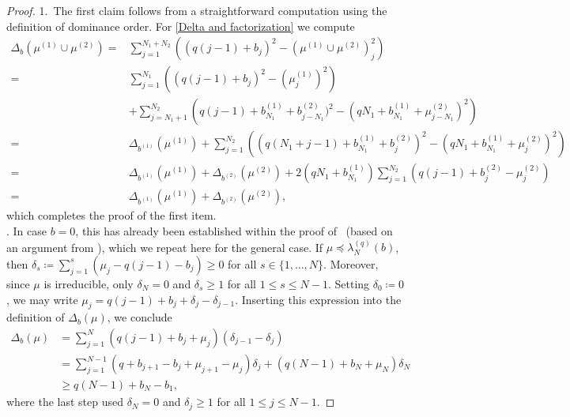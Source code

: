 \documentclass[letterpaper, DIV=17]{scrartcl}
\numberwithin{equation}{section}
\theoremstyle{definition}
\begin{document}
		\begin{proof}
			1.~The first claim follows from a straightforward computation using the definition of dominance order.		
			For \eqref{Delta and factorization} we compute
			\begin{align*}
				\Delta_b(\mu^{(1)}\cup \mu^{(2)})
				=  & \sum_{j=1}^{N_1+N_2} \left((q (j-1) + b_j )^2 - (\mu^{(1)}\cup \mu^{(2)})_j^2\right) \\
				=  &\sum_{j=1}^{N_1} \left((q (j-1) + b_j )^2 - (\mu^{(1)}_j)^2\right) \\
				& + \sum_{j=N_1+1}^{N_2} \left(q (j-1) + b_{N_1}^{(1)} + b_{j-N_1}^{(2)} )^2-(qN_1+b_{N_1}^{(1)} +\mu^{(2)}_{j-N_1} )^2\right) \\
				= \ &  \Delta_{b^{(1)}}(\mu^{(1)}) + \sum_{j=1}^{N_2} \left((q(N_1+j-1 )+b_{N_1}^{(1)}+ b_{j}^{(2)} )^2 -(qN_1+b_{N_1}^{(1)}+\mu^{(2)}_{j} )^2\right) \\
			= \ &  \Delta_{b^{(1)}}(\mu^{(1)}) +  \Delta_{b^{(2)}}(\mu^{(2)}) +  2( q N_1 + b_{N_1}^{(1)} ) \sum_{j=1}^{N_2} \left( q(j-1) +b_{j}^{(2)}  -\mu_j^{(2)}\right) \\
				= &  \Delta_{b^{(1)}}(\mu^{(1)}) +  \Delta_{b^{(2)}}(\mu^{(2)}) ,
			\end{align*}
		which completes the proof of the first item.\\
		. In case $ b = 0 $, this has already been established within the proof of~\cite[Lemma 5]{jansen2009symmetry} (based on an argument from \cite{di1994laughlin}), which we repeat here for the general case.
		If $\mu \preceq \lambda^{(q)}_N(b)$, then $ \delta_s \coloneqq \sum_{j=1}^s \left( \mu_j - q (j-1) - b_j\right) \geq 0 $ for all $ s \in \{1, \dots , N \} $. Moreover, since $ \mu $ is irreducible, only $ \delta_N = 0 $ and $ \delta_s \geq 1 $ for all $ 1 \leq s \leq N-1 $. Setting $ \delta_0 \coloneqq 0 $, we may write $ \mu_j = q (j-1) + b_j + \delta_j - \delta_{j-1} $. Inserting this expression into the definition of $ \Delta_b(\mu)  $, we conclude
		\begin{align*}
		 \Delta_b(\mu) & = \sum_{j=1}^N \left( q(j-1) + b_j +\mu_j \right) \left( \delta_{j-1} - \delta_j \right) \\
		 & = \sum_{j=1}^{N-1}  \left( q + b_{j+1} - b_j  +\mu_{j+1}-\mu_j \right) \delta_j + \left( q (N-1) + b_N + \mu_N \right) \delta_N \\
		 & \geq q (N-1) + b_N - b_1 ,
		\end{align*} 
		where the last step used $\delta_N = 0 $ and $ \delta_j \geq 1 $ for all $ 1 \leq j \leq N-1 $. 
		\end{proof}
\end{document}
